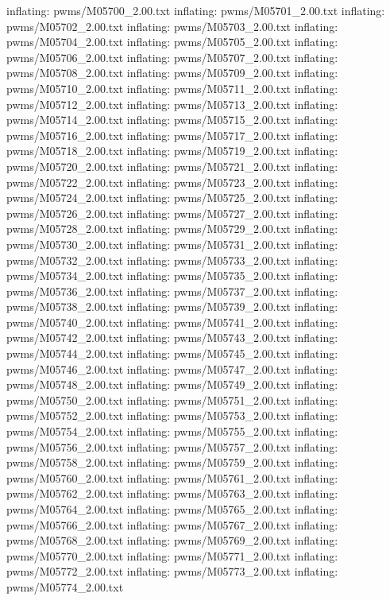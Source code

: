 \documentclass[letterpaper,10pt,english]{sphinxmanual}
\begin{document}
{\begin{sphinxVerbatim}[commandchars=\\\{\}]
  inflating: pwms/M05700\_2.00.txt
  inflating: pwms/M05701\_2.00.txt
  inflating: pwms/M05702\_2.00.txt
  inflating: pwms/M05703\_2.00.txt
  inflating: pwms/M05704\_2.00.txt
  inflating: pwms/M05705\_2.00.txt
  inflating: pwms/M05706\_2.00.txt
  inflating: pwms/M05707\_2.00.txt
  inflating: pwms/M05708\_2.00.txt
  inflating: pwms/M05709\_2.00.txt
  inflating: pwms/M05710\_2.00.txt
  inflating: pwms/M05711\_2.00.txt
  inflating: pwms/M05712\_2.00.txt
  inflating: pwms/M05713\_2.00.txt
  inflating: pwms/M05714\_2.00.txt
  inflating: pwms/M05715\_2.00.txt
  inflating: pwms/M05716\_2.00.txt
  inflating: pwms/M05717\_2.00.txt
  inflating: pwms/M05718\_2.00.txt
  inflating: pwms/M05719\_2.00.txt
  inflating: pwms/M05720\_2.00.txt
  inflating: pwms/M05721\_2.00.txt
  inflating: pwms/M05722\_2.00.txt
  inflating: pwms/M05723\_2.00.txt
  inflating: pwms/M05724\_2.00.txt
  inflating: pwms/M05725\_2.00.txt
  inflating: pwms/M05726\_2.00.txt
  inflating: pwms/M05727\_2.00.txt
  inflating: pwms/M05728\_2.00.txt
  inflating: pwms/M05729\_2.00.txt
  inflating: pwms/M05730\_2.00.txt
  inflating: pwms/M05731\_2.00.txt
  inflating: pwms/M05732\_2.00.txt
  inflating: pwms/M05733\_2.00.txt
  inflating: pwms/M05734\_2.00.txt
  inflating: pwms/M05735\_2.00.txt
  inflating: pwms/M05736\_2.00.txt
  inflating: pwms/M05737\_2.00.txt
  inflating: pwms/M05738\_2.00.txt
  inflating: pwms/M05739\_2.00.txt
  inflating: pwms/M05740\_2.00.txt
  inflating: pwms/M05741\_2.00.txt
  inflating: pwms/M05742\_2.00.txt
  inflating: pwms/M05743\_2.00.txt
  inflating: pwms/M05744\_2.00.txt
  inflating: pwms/M05745\_2.00.txt
  inflating: pwms/M05746\_2.00.txt
  inflating: pwms/M05747\_2.00.txt
  inflating: pwms/M05748\_2.00.txt
  inflating: pwms/M05749\_2.00.txt
  inflating: pwms/M05750\_2.00.txt
  inflating: pwms/M05751\_2.00.txt
  inflating: pwms/M05752\_2.00.txt
  inflating: pwms/M05753\_2.00.txt
  inflating: pwms/M05754\_2.00.txt
  inflating: pwms/M05755\_2.00.txt
  inflating: pwms/M05756\_2.00.txt
  inflating: pwms/M05757\_2.00.txt
  inflating: pwms/M05758\_2.00.txt
  inflating: pwms/M05759\_2.00.txt
  inflating: pwms/M05760\_2.00.txt
  inflating: pwms/M05761\_2.00.txt
  inflating: pwms/M05762\_2.00.txt
  inflating: pwms/M05763\_2.00.txt
  inflating: pwms/M05764\_2.00.txt
  inflating: pwms/M05765\_2.00.txt
  inflating: pwms/M05766\_2.00.txt
  inflating: pwms/M05767\_2.00.txt
  inflating: pwms/M05768\_2.00.txt
  inflating: pwms/M05769\_2.00.txt
  inflating: pwms/M05770\_2.00.txt
  inflating: pwms/M05771\_2.00.txt
  inflating: pwms/M05772\_2.00.txt
  inflating: pwms/M05773\_2.00.txt
  inflating: pwms/M05774\_2.00.txt

\end{sphinxVerbatim}}
\end{document}
